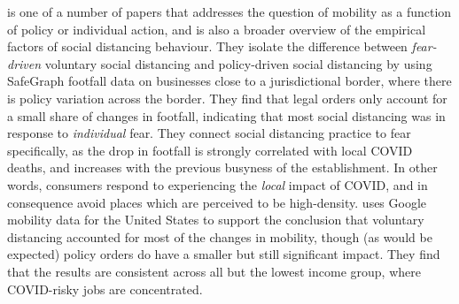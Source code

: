 \documentclass{article}
\begin{document}
\textcite{goolsbeeFearLockdownDiversion2021} is one of a number of papers that addresses the question of mobility as a function of policy or individual action, and is also a broader overview of the empirical factors of social distancing behaviour. They isolate the difference between \textit{fear-driven} voluntary social distancing and policy-driven social distancing by using SafeGraph footfall data on businesses close to a jurisdictional border, where there is policy variation across the border. They find that legal orders only account for a small share of changes in footfall, indicating that most social distancing was in response to \textit{individual} fear. They connect social distancing practice to fear specifically, as the drop in footfall is strongly correlated with local COVID deaths, and increases with the previous busyness of the establishment. In other words, consumers respond to experiencing the \textit{local} impact of COVID, and in consequence avoid places which are perceived to be high-density. \textcite{maloneyDeterminantsSocialDistancing2020} uses Google mobility data for the United States to support the conclusion that voluntary distancing accounted for most of the changes in mobility, though (as would be expected) policy orders do have a smaller but still significant impact. They find that the results are consistent across all but the lowest income group, where COVID-risky jobs are concentrated. 
\end{document}
